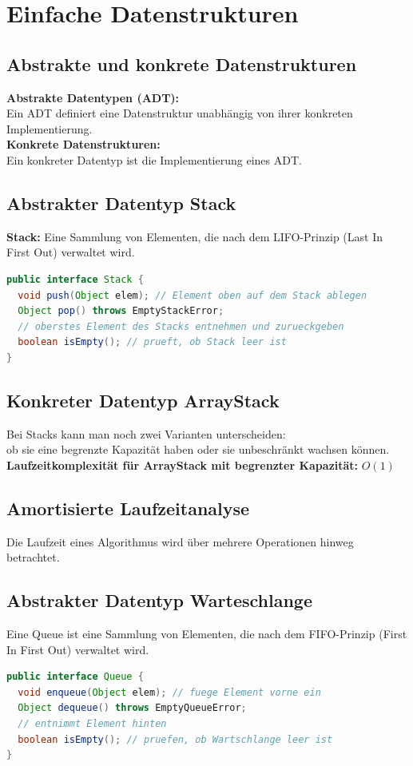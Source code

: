 \documentclass{scrreprt}
\begin{document}
\chapter{Einfache Datenstrukturen}
\section{Abstrakte und konkrete Datenstrukturen}
\textbf{Abstrakte Datentypen (ADT):}
\\Ein ADT definiert eine Datenstruktur unabhängig von ihrer konkreten Implementierung.
\\\textbf{Konkrete Datenstrukturen:}
\\Ein konkreter Datentyp ist die Implementierung eines ADT.
\section{Abstrakter Datentyp Stack}
\textbf{Stack:} Eine Sammlung von Elementen, die nach dem LIFO-Prinzip (Last In First Out) verwaltet wird.
\\\begin{lstlisting}[language=Java]
public interface Stack {
  void push(Object elem); // Element oben auf dem Stack ablegen
  Object pop() throws EmptyStackError;
  // oberstes Element des Stacks entnehmen und zurueckgeben
  boolean isEmpty(); // prueft, ob Stack leer ist
}
\end{lstlisting}
\section{Konkreter Datentyp ArrayStack}
Bei Stacks kann man noch zwei Varianten unterscheiden:
\\ob sie eine begrenzte Kapazität haben oder sie unbeschränkt wachsen können.
\\\textbf{Laufzeitkomplexität für ArrayStack mit begrenzter Kapazität:} $O(1)$
\section{Amortisierte Laufzeitanalyse}
Die Laufzeit eines Algorithmus wird über mehrere Operationen hinweg betrachtet.
\section{Abstrakter Datentyp Warteschlange}
Eine Queue ist eine Sammlung von Elementen, die nach dem FIFO-Prinzip (First In First Out) verwaltet wird.
\\\begin{lstlisting}[language=Java]
public interface Queue {
  void enqueue(Object elem); // fuege Element vorne ein
  Object dequeue() throws EmptyQueueError;
  // entnimmt Element hinten
  boolean isEmpty(); // pruefen, ob Wartschlange leer ist
}
\end{lstlisting}
\end{document}
